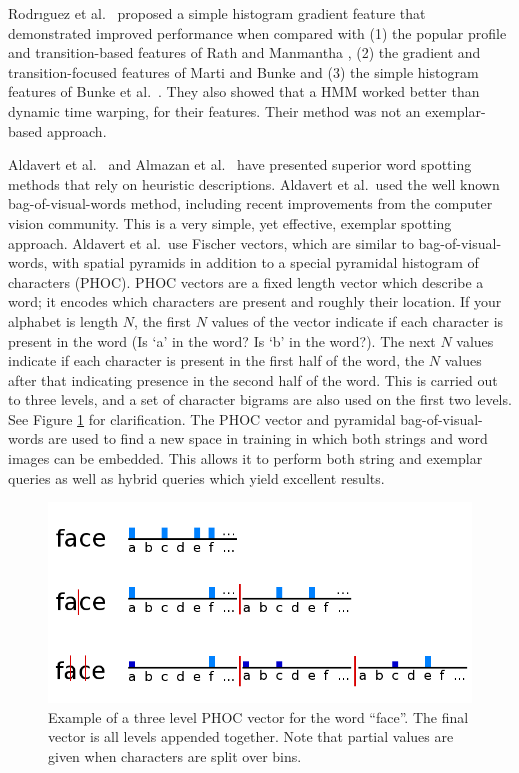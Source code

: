 \documentclass[ms,electronic,twosidetoc,letterpaper,chaptercenter,parttop,lol,lof,lot]{byumsphd}
\begin{document}
Rodr{\i}guez et al.~\cite{Rodrıguez2008} proposed a simple histogram gradient feature that demonstrated improved performance when compared with (1) the popular profile and transition-based features of Rath and Manmantha \cite{Rath2003}, (2) the gradient and transition-focused features of Marti and Bunke \cite{Marti2001} and (3) the simple histogram features of Bunke et al.~\cite{Bunke2004}. They also showed that a HMM worked better than dynamic time warping, for their features. Their method was not an exemplar-based approach.

Aldavert et al.~\cite{Aldavert2015} and Almazan et al.~\cite{Almazan2014} have presented superior word spotting methods that rely on heuristic descriptions. Aldavert et al.~used the well known bag-of-visual-words method, including recent improvements from the computer vision community. This is a very simple, yet effective, exemplar spotting approach. Aldavert et al.~use Fischer vectors, which are similar to bag-of-visual-words, with spatial pyramids in addition to a special pyramidal histogram of characters (PHOC).
PHOC vectors are a fixed length vector which describe a word; it encodes which characters are present and roughly their location. If your alphabet is length $N$, the first $N$ values of the vector indicate if each character is present in the word (Is `a' in the word? Is `b' in the word?). The next $N$ values indicate if each character is present in the first half of the word, the $N$ values after that indicating presence in the second half of the word. This is carried out to three levels, and a set of character bigrams are also used on the first two levels. See Figure \ref{fig:phoc} for clarification.
The PHOC vector and pyramidal bag-of-visual-words are used to find a new space in training in which both strings and word images can be embedded. This allows it to perform both string and exemplar queries as well as hybrid queries which yield excellent results.

\begin{figure}[t]
    \centering
    \includegraphics[width=.65\textwidth]{phoc}
    \caption{Example of a three level PHOC vector for the word ``face''. The final vector is all levels appended together. Note that partial values are given when characters are split over bins.}
    \label{fig:phoc}
\end{figure}
\end{document}
